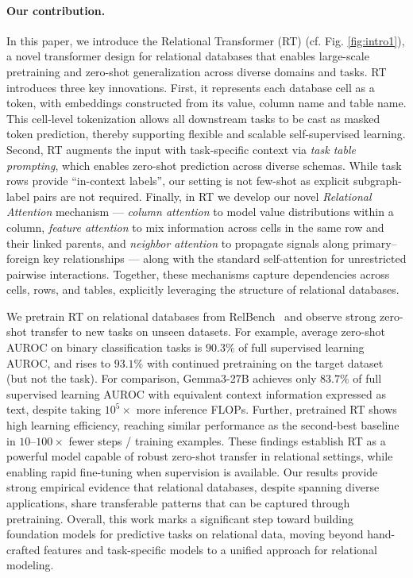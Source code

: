 \paragraph{Our contribution.} In this paper, we introduce the Relational Transformer (RT) (cf. Fig. \ref{fig:intro1}), a novel transformer design for relational databases that enables large-scale pretraining and zero-shot generalization across diverse domains and tasks. RT introduces three key innovations. First, it represents each database cell as a token, with embeddings constructed from its value, column name and table name.
This cell-level tokenization allows all downstream tasks to be cast as masked token prediction, thereby supporting flexible and scalable self-supervised learning. Second, RT augments the input with task-specific context via \textit{task table prompting}, which enables zero-shot prediction across diverse schemas.
While task rows provide ``in-context labels'',
our setting is not few-shot
as explicit subgraph-label pairs are not required.
Finally, in RT we develop our novel \textit{Relational Attention} mechanism --- \textit{column attention} to model value distributions within a column, \textit{feature attention} to mix information across cells in the same row and their linked parents, and \textit{neighbor attention} to propagate signals along primary–foreign key relationships --- along with the standard self-attention for unrestricted pairwise interactions. Together, these mechanisms capture dependencies across cells, rows, and tables, explicitly leveraging the structure of relational databases.

We pretrain RT on relational databases from RelBench~\citep{relbench}
and observe strong zero-shot transfer to new tasks on unseen datasets.
For example,
average zero-shot AUROC on binary classification tasks
is $90.3\%$ of full supervised learning AUROC,
and rises to $93.1\%$ with continued pretraining on the target dataset
(but not the task).
For comparison,
Gemma3-27B achieves only $83.7\%$ of full supervised learning AUROC
with equivalent context information expressed as text,
despite taking $10^5\times$ more inference FLOPs.
Further, pretrained RT shows high learning efficiency,
reaching similar performance as the second-best baseline
in $10$--$100\times$ fewer steps / training examples.
These findings establish RT as a powerful model capable of robust zero-shot transfer in relational settings, while enabling rapid fine-tuning when supervision is available. Our results provide strong empirical evidence that relational databases, despite spanning diverse applications, share transferable patterns that can be captured through pretraining.
Overall, this work marks a significant step toward building foundation models for predictive tasks on relational data, moving beyond hand-crafted features and task-specific models to a unified approach for relational modeling.


